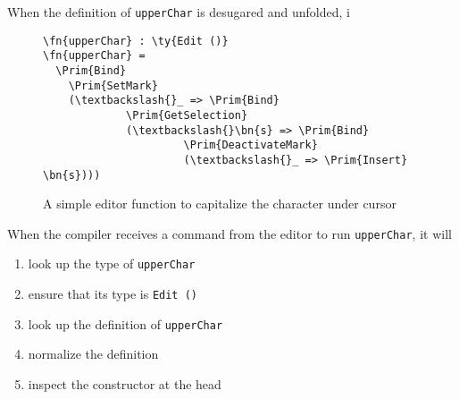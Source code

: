 \documentclass[sigplan, authordraft]{acmart}
\newcommand\fakeslant[1]{%
  \special{pdf: literal 1 0 0.167 1 0 0 cm}#1\special{pdf: literal 1 0 -0.167 1 0 0 cm}}
\newcommand{\IdrisData}[1]{\textcolor{IdrisRed}{#1}}
\newcommand{\IdrisType}[1]{\textcolor{IdrisBlue}{#1}}
\newcommand{\IdrisBound}[1]{\textcolor{IdrisLilac}{\fakeslant{#1}}}
\newcommand{\IdrisFunction}[1]{\textcolor{IdrisGreen}{#1}}
\newcommand{\ty}[1]{\IdrisType{\texttt{#1}}}
\newcommand{\fn}[1]{\IdrisFunction{\texttt{#1}}}
\newcommand{\dt}[1]{\IdrisData{\texttt{#1}}}
\newcommand{\bn}[1]{\IdrisBound{\texttt{#1}}}
\newcommand{\Prim}[1]{\dt{Prim\_\_#1}}
\begin{document}
When the definition of \fn{upperChar} is desugared and unfolded, i

\begin{figure}[H]
\begin{Verbatim}
\fn{upperChar} : \ty{Edit ()}
\fn{upperChar} =
  \Prim{Bind}
    \Prim{SetMark}
    (\textbackslash{}_ => \Prim{Bind}
             \Prim{GetSelection}
             (\textbackslash{}\bn{s} => \Prim{Bind}
                      \Prim{DeactivateMark}
                      (\textbackslash{}_ => \Prim{Insert} \bn{s})))
\end{Verbatim}
\caption{A simple editor function to capitalize the character under cursor}
\label{fig:upperChar}
\end{figure}

When the compiler receives a command from the editor to run \fn{upperChar}, it will
\begin{enumerate}
  \item look up the type of \fn{upperChar}
  \item ensure that its type is \ty{Edit ()}
  \item look up the definition of \fn{upperChar}
  \item normalize the definition
  \item inspect the constructor at the head
\end{enumerate}
\end{document}
